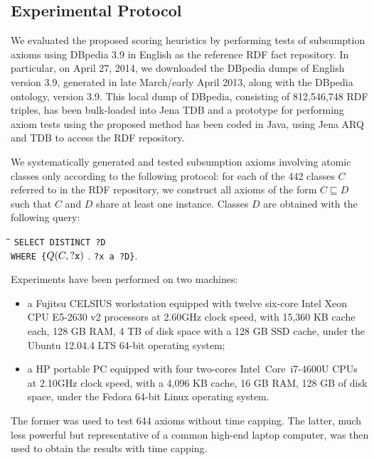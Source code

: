 \documentclass[conference]{IEEEtran}
\begin{document}
\subsection{Experimental Protocol}

We evaluated the proposed scoring heuristics by performing tests of subsumption
axioms using DBpedia 3.9 in English as the reference RDF fact repository.
In particular, on April 27, 2014, we downloaded the DBpedia dumps of English version 3.9,
generated in late March/early April 2013, along with the DBpedia ontology, version 3.9.
This local dump of DBpedia, consisting of 812,546,748 RDF triples,
has been bulk-loaded into Jena TDB and a prototype
for performing axiom tests using the proposed method has been coded in Java,
using Jena ARQ and TDB to access the RDF repository.

We systematically generated and tested subsumption axioms
involving atomic classes only according to the following protocol:
for each of the 442 classes $C$ referred to in the RDF repository,
we construct all axioms of the form $C \sqsubseteq D$ such that $C$ and $D$
share at least one instance. Classes $D$ are obtained with the following query: 


\begin{minipage}[c]{5in}
    \begin{tabbing}
      \quad\=\quad\=\quad\=\kill
      \texttt{SELECT DISTINCT ?D}\\
      \texttt{WHERE \{}$Q(C, \mbox{\tt ?x})$ . \texttt{?x a ?D\}}.
    \end{tabbing}
  \end{minipage}


Experiments have been performed on two machines:
\begin{itemize}
\item a Fujitsu CELSIUS workstation equipped
with twelve six-core Intel Xeon CPU E5-2630 v2 processors at 2.60GHz clock speed,
with 15,360 KB cache each, 128 GB RAM,
4 TB of disk space with a 128 GB SSD cache,
under the Ubuntu  12.04.4 LTS 64-bit operating system;
\item a HP  portable PC equipped
with four two-cores Intel\textregistered\ Core\texttrademark\ i7-4600U CPUs at 2.10GHz clock speed,
with a 4,096 KB cache, 16 GB RAM,
128 GB of disk space,
under the Fedora 64-bit Linux operating system.
\end{itemize}
The former was used to test 644 axioms without time capping.
The latter, much less powerful but representative of a common high-end laptop computer,
was then used to obtain the results with time capping.
\end{document}
